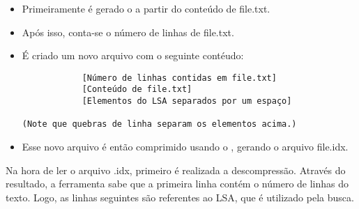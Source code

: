 \begin{itemize}

\item Primeiramente é gerado o \lsa a partir do conteúdo de file.txt.
\item Após isso, conta-se o número de linhas de file.txt.
\item É criado um novo arquivo com o seguinte contéudo:
\begin{verbatim}
            [Número de linhas contidas em file.txt]
            [Conteúdo de file.txt]
            [Elementos do LSA separados por um espaço]

(Note que quebras de linha separam os elementos acima.)
\end{verbatim}
\item Esse novo arquivo é então comprimido usando o \lz, gerando o arquivo file.idx.

\end{itemize}

Na hora de ler o arquivo .idx, primeiro é realizada a descompressão. Através do
resultado, a ferramenta sabe que a primeira linha contém o número de linhas do
texto. Logo, as linhas seguintes são referentes ao LSA, que é utilizado pela
busca.
